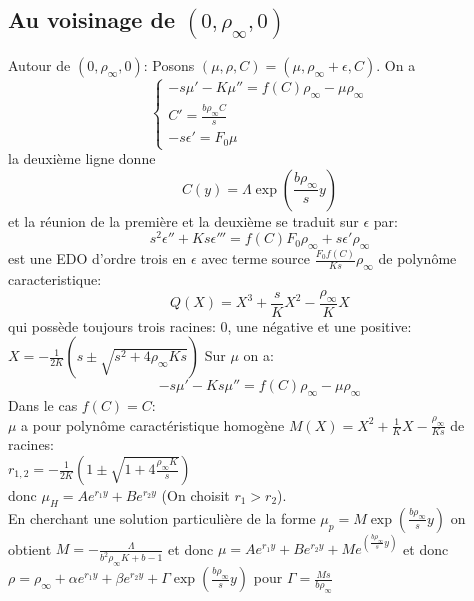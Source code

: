\subsection{Au voisinage de $(0,\rho_\infty,0)$} 
Autour de $(0,\rho_\infty,0)$:
Posons $(\mu,\rho,C)=(\mu, \rho_\infty + \epsilon, C)$. On a \\
\begin{equation} \left\{ \begin{array}{ll} -s \mu'-K\mu''=f(C)\rho_\infty-\mu\rho_\infty\\C'=\frac{b\rho_\infty C}{s} \\
-s\epsilon'= F_0\mu \end{array}\right.
\end{equation}
la deuxième ligne donne \begin{equation}
C(y) = \Lambda\exp(\frac{b\rho_\infty}{s}y )
\end{equation}
et la réunion de la première et la deuxième se traduit sur $\epsilon$ par:
\begin{equation}
	s^2 \epsilon''+Ks\epsilon'''=f(C)F_0\rho_\infty+s\epsilon'\rho_\infty
\end{equation} est une EDO d'ordre trois en $\epsilon$ avec terme source $\frac{F_0f(C)}{Ks} \rho_\infty$ de polynôme caracteristique: \begin{equation}
	Q(X)=X^3+\frac{s}{K}X^2-\frac{\rho_\infty}{K}X
\end{equation}
qui possède toujours trois racines:  $0$, une négative et une positive: $X= - \frac{1}{2K}(s \pm \sqrt{s^2+4\rho_\infty Ks})$
Sur $\mu$ on a: \begin{equation}
	-s \mu'-Ks\mu''=f(C)\rho_\infty-\mu\rho_\infty
\end{equation}
Dans le cas $f(C)=C$:\\
$\mu$ a pour polynôme caractéristique homogène $M(X)=X^2 +\frac{1}{K}X - \frac{\rho_\infty}{Ks}$ de racines:\\$r_{1,2}= - \frac{1}{2K}(1 \pm \sqrt{1+4 \frac{\rho_\infty K}{s}})$ \\ donc $\mu_H = Ae^{r_1y}+ Be^{r_2y}$ (On choisit $r_1>r_2$).\\
En cherchant une solution particulière de la forme $\mu_p =M\exp(\frac{b\rho_\infty}{s}y )$ on obtient $M = - \frac{\Lambda}{b^2\rho_\infty K + b - 1}$ et donc $\mu=Ae^{r_1y}+ Be^{r_2y}+M e^(\frac{b\rho_\infty}{s}y )$
et donc $\rho = \rho_\infty + \alpha e^{r_1y} + \beta e^{r_2y} + \Gamma \exp(\frac{b\rho_\infty}{s}y)$ pour $\Gamma = \frac{Ms}{b\rho_\infty} $